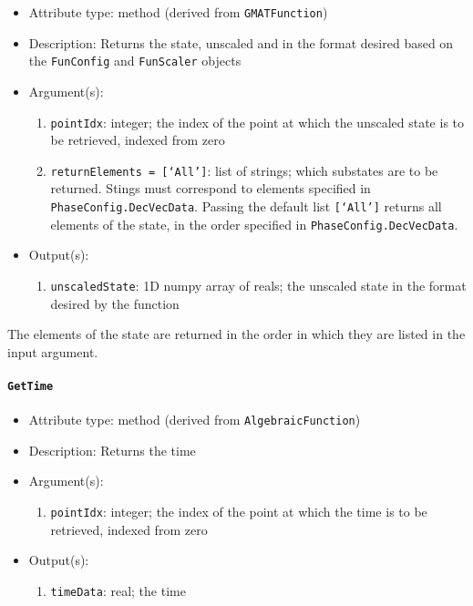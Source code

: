 \documentclass[]{article}
\begin{document}
\begin{itemize}
	\item Attribute type: method (derived from \texttt{GMATFunction})
	\item Description: Returns the state, unscaled and in the format desired based on the \texttt{FunConfig} and \texttt{FunScaler} objects
	\item Argument(s):
	\begin{enumerate}
		\item \texttt{pointIdx}: integer; the index of the point at which the unscaled state is to be retrieved, indexed from zero
		\item \texttt{returnElements = [`All']}: list of strings; which substates are to be returned. Stings must correspond to elements specified in \texttt{PhaseConfig.DecVecData}. Passing the default list \texttt{[`All']} returns all elements of the state, in the order specified in \texttt{PhaseConfig.DecVecData}. 
	\end{enumerate}
	\item Output(s):
	\begin{enumerate}
		\item \texttt{unscaledState}: 1D numpy array of reals; the unscaled state in the format desired by the function
	\end{enumerate}
\end{itemize}

The elements of the state are returned in the order in which they are listed in the input argument.

\paragraph{\texttt{GetTime}}

\begin{itemize}
	\item Attribute type: method (derived from \texttt{AlgebraicFunction})
	\item Description: Returns the time
	\item Argument(s):
	\begin{enumerate}
		\item \texttt{pointIdx}: integer; the index of the point at which the time is to be retrieved, indexed from zero
	\end{enumerate}
	\item Output(s):
	\begin{enumerate}
		\item \texttt{timeData}: real; the time
	\end{enumerate}
\end{itemize}
\end{document}
